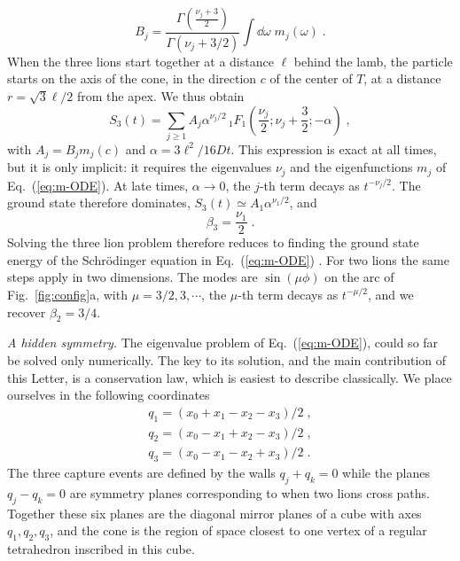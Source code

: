 \documentclass[aps,prl,twocolumn,superscriptaddress,floatfix,nofootinbib]{revtex4-2}
\begin{document}
\begin{equation} \label{eq:Bj-solution}
    B_j = \frac{\Gamma(\frac{\nu_j + 3}{2})}{\Gamma(\nu_j + 3/2)} \int \dd \omega \; m_j(\omega) \;.
\end{equation}
When the three lions start together at a distance $\ell$ behind the lamb, the particle starts on the axis of the cone, in the direction $c$ of the center of $T$, at a distance $r = \sqrt{3} \ell/2$ from the apex. We thus obtain \cite{SM}
\begin{equation} \label{eq:S3-series}
S_3(t) = \sum_{j \geq 1} A_j \alpha^{\nu_j/2} \,_1F_1(\frac{\nu_j}{2}; \nu_j + \frac{3}{2}; -\alpha) \;,
\end{equation}
with $A_j= B_j m_j(c)$ and $\alpha = 3 \ell^2/16 D t$. This expression is exact at all times,
but it is only implicit: it requires the eigenvalues $\nu_j$ and
the eigenfunctions $m_j$ of Eq.~(\ref{eq:m-ODE}). At late times, $\alpha \to 0$, the $j$-th term decays as $t^{-\nu_j /2}$. The ground state therefore dominates, $S_3(t) \simeq A_1 \alpha^{\nu_1 /2}$, and
\begin{equation} \label{eq:beta-nu}
    \beta_3 = \frac{\nu_1}{2}\;.
\end{equation}
Solving the three lion problem therefore reduces to finding the ground state energy of the Schr\"odinger equation in Eq.~(\ref{eq:m-ODE}) \cite{RT09}. For two lions the same steps apply in two dimensions. The modes are $\sin(\mu \phi)$ on the arc of Fig.~\ref{fig:config}a, with $\mu = 3/2,3,\cdots$, the $\mu$-th term
decays as $t^{-\mu/2}$, and we recover $\beta_2 = 3/4$.

\emph{A hidden symmetry.}  The eigenvalue problem of Eq.~(\ref{eq:m-ODE}), could so far be solved only numerically. The key to its solution, and the main contribution of this Letter, is a conservation law, which is easiest to describe classically. We place ourselves in the following coordinates
\begin{align}
    q_1 = (x_0 + x_1 - x_2 - x_3)/2 \;,\nonumber\\
    q_2 = (x_0 - x_1 + x_2 - x_3)/2 \;,\label{eq:def-q}\\
    q_3 = (x_0 - x_1 - x_2 + x_3)/2 \;.\nonumber
\end{align}
The three capture events are defined by the walls $q_j + q_k = 0$ while the planes $q_j - q_k = 0$ are symmetry planes corresponding to when two lions cross paths. Together these six planes are the diagonal mirror planes of a cube with axes $q_1, q_2, q_3$, and the cone is the region of space
closest to one vertex of a regular tetrahedron inscribed in this cube.
\end{document}
